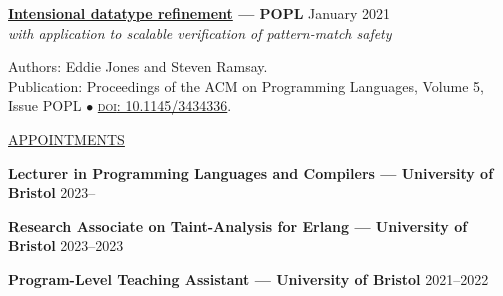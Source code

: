 \documentclass[10pt]{letter}
\renewcommand{\emph}[1]{\textit{#1}}
\newif\iflong
\begin{document}
\vspace{10pt}

\textbf{\href{https://dl.acm.org/doi/10.1145/3434336}{Intensional datatype refinement} --- POPL} \hfill January 2021\\
\emph{with application to scalable verification of pattern-match safety}

Authors: Eddie Jones and Steven Ramsay.\\
Publication: Proceedings of the ACM on Programming Languages, Volume 5, Issue POPL \( \bullet \) \href{https://doi.org/10.1145/3434336}{\textsc{doi}: 10.1145/3434336}.

\vspace{10pt}

\uline{{\large APPOINTMENTS}\hfill}

\vspace{5pt}

\textbf{Lecturer in Programming Languages and Compilers --- University of Bristol} \hfill 2023--\phantom{2023}

\textbf{Research Associate on Taint-Analysis for Erlang --- University of Bristol} \hfill 2023--2023

\iflong
\vspace{-5pt}
\begin{itemize}
  \setlength\itemsep{0pt}
  \item With funding from Meta, we are pursuing an extension of our intensional datatype refinement type system to Erlang. This project aims to statically approximate the flow of private information through a program in order to ensure compliance with data protection guidelines.
\end{itemize}
\fi

\textbf{Program-Level Teaching Assistant --- University of Bristol} \hfill 2021--2022

\iflong
\begin{itemize}
  \item As a program-level teaching assistant, I led tutorials designed to cross module boundaries and give students a more comprehensive understanding of computer science outside the curriculum. %
  
  \item I also contributed content to this series, designing worksheets on bisimulation and the topological aspects of functional programming languages.
\end{itemize}
\fi
\end{document}
